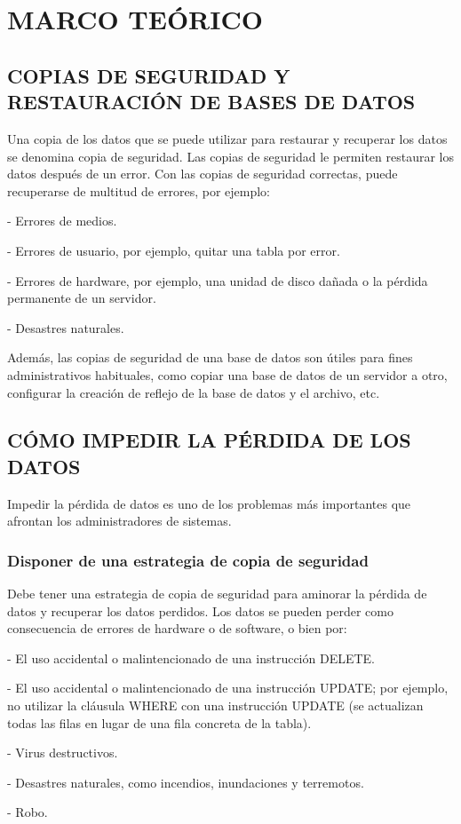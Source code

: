 \chapter{MARCO TEÓRICO}
\section{COPIAS DE SEGURIDAD Y RESTAURACIÓN DE BASES DE DATOS}
Una copia de los datos que se puede utilizar para restaurar y recuperar los datos se denomina copia de seguridad. Las copias de seguridad le permiten restaurar los datos después de un error. Con las copias de seguridad correctas, puede recuperarse de multitud de errores, por ejemplo:



\item
\item       - Errores de medios.
\item       - Errores de usuario, por ejemplo, quitar una tabla por error.
\item       - Errores de hardware, por ejemplo, una unidad de disco dañada o la pérdida permanente de un servidor.
\item       - Desastres naturales.
\item
\item

 Además, las copias de seguridad de una base de datos son útiles para fines administrativos habituales, como copiar una base de datos de un servidor a otro, configurar la creación de reflejo de la base de datos y el archivo, etc.

\section{CÓMO IMPEDIR LA PÉRDIDA DE LOS DATOS}
Impedir la pérdida de datos es uno de los problemas más importantes que afrontan los administradores de sistemas.

\subsection{Disponer de una estrategia de copia de seguridad}
Debe tener una estrategia de copia de seguridad para aminorar la pérdida de datos y recuperar los datos perdidos. Los datos se pueden perder como consecuencia de errores de hardware o de software, o bien por:

\item
\item - El uso accidental o malintencionado de una instrucción DELETE.
\item  - El uso accidental o malintencionado de una instrucción UPDATE; por ejemplo, no utilizar la cláusula WHERE con una instrucción UPDATE (se actualizan todas las filas en lugar de una fila concreta de la tabla).
\item  - Virus destructivos.
\item  - Desastres naturales, como incendios, inundaciones y terremotos.
\item  - Robo.
\item
\item

